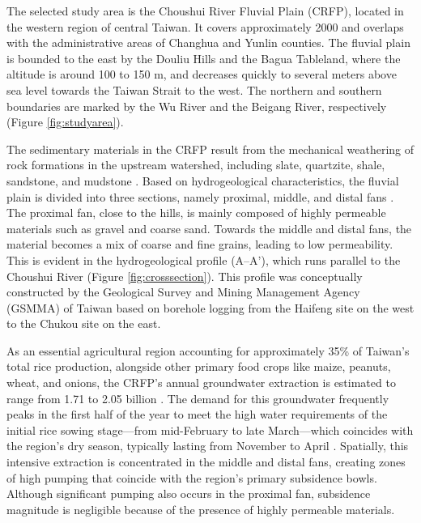 
The selected study area is the Choushui River Fluvial Plain (CRFP), located in the western region of central Taiwan. It covers approximately 2000  and overlaps with the administrative areas of Changhua and Yunlin counties. The fluvial plain is bounded to the east by the Douliu Hills and the Bagua Tableland, where the altitude is around 100 to 150 m, and decreases quickly to several meters above sea level towards the Taiwan Strait to the west. The northern and southern boundaries are marked by the Wu River and the Beigang River, respectively (Figure \ref{fig:studyarea}).

The sedimentary materials in the CRFP result from the mechanical weathering of rock formations in the upstream watershed, including slate, quartzite, shale, sandstone, and mudstone \citep{RN17, RN47}. Based on hydrogeological characteristics, the fluvial plain is divided into three sections, namely proximal, middle, and distal fans \citep{RN46}. The proximal fan, close to the hills, is mainly composed of highly permeable materials such as gravel and coarse sand. Towards the middle and distal fans, the material becomes a mix of coarse and fine grains, leading to low permeability. This is evident in the hydrogeological profile ($\text{A--A'}$), which runs parallel to the Choushui River (Figure \ref{fig:crosssection}). This profile was conceptually constructed by the Geological Survey and Mining Management Agency (GSMMA) of Taiwan based on borehole logging from the Haifeng site on the west to the Chukou site on the east.

As an essential agricultural region accounting for approximately 35\% of Taiwan's total rice production, alongside other primary food crops like maize, peanuts, wheat, and onions, the CRFP's annual groundwater extraction is estimated to range from 1.71 to 2.05 billion  \citep{craf_pumping}. The demand for this groundwater frequently peaks in the first half of the year to meet the high water requirements of the initial rice sowing stage—from mid-February to late March—which coincides with the region's dry season, typically lasting from November to April \citep{RN64}. Spatially, this intensive extraction is concentrated in the middle and distal fans, creating zones of high pumping that coincide with the region's primary subsidence bowls. Although significant pumping also occurs in the proximal fan, subsidence magnitude is negligible because of the presence of highly permeable materials.


